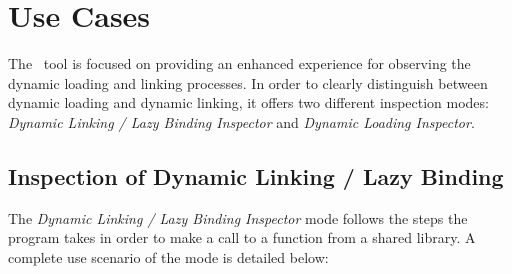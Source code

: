 \chapter{Use Cases}
\label{chapter:use-cases}

The \project\ tool is focused on providing an enhanced experience for observing the dynamic loading and linking processes. In order to clearly distinguish between dynamic loading and dynamic linking, it offers two different inspection modes: \textit{Dynamic Linking / Lazy Binding Inspector} and \textit{Dynamic Loading Inspector}.

\section{Inspection of Dynamic Linking / Lazy Binding}
\label{sec:dyn-link-inspector-mode}

The \textit{Dynamic Linking / Lazy Binding Inspector} mode follows the steps the program takes in order to make a call to a function from a shared library. A complete use scenario of the mode is detailed below:

